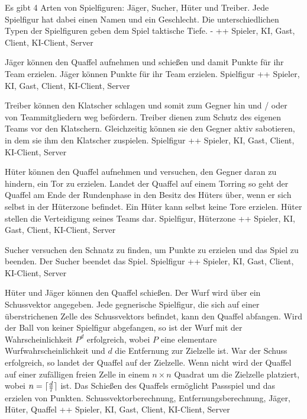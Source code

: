         {Es gibt 4 Arten von Spielfiguren: Jäger, Sucher, Hüter und Treiber. Jede Spielfigur hat dabei einen Namen und ein Geschlecht.}
        {Die unterschiedlichen Typen der Spielfiguren geben dem Spiel taktische Tiefe.}
        {-}
        {++}
        {Spieler, KI, Gast, Client, KI-Client, Server}

        {Jäger können den Quaffel aufnehmen und schießen und damit Punkte für ihr Team erzielen.}
        {Jäger können Punkte für ihr Team erzielen.}
        {Spielfigur}
        {++}
        {Spieler, KI, Gast, Client, KI-Client, Server}

        {Treiber können den Klatscher schlagen und somit zum Gegner hin und / oder von Teammitgliedern weg befördern.}
        {Treiber dienen zum Schutz des eigenen Teams vor den Klatschern. Gleichzeitig können sie den Gegner aktiv sabotieren, in dem sie ihm den Klatscher zuspielen.}
        {Spielfigur}
        {++}
        {Spieler, KI, Gast, Client, KI-Client, Server}

        {Hüter können den Quaffel aufnehmen und versuchen, den Gegner daran zu hindern, ein Tor zu erzielen. Landet der Quaffel auf einem Torring so geht der Quaffel am Ende der Rundenphase in den Besitz des Hüters über, wenn er sich selbst in der Hüterzone befindet. Ein Hüter kann selbst keine Tore erzielen.}
        {Hüter stellen die Verteidigung seines Teams dar.}
        {Spielfigur, Hüterzone}
        {++}
        {Spieler, KI, Gast, Client, KI-Client, Server}

        {Sucher versuchen den Schnatz zu finden, um Punkte zu erzielen und das Spiel zu beenden.}
        {Der Sucher beendet das Spiel.}
        {Spielfigur}
        {++}
        {Spieler, KI, Gast, Client, KI-Client, Server}
        
        {Hüter und Jäger können den Quaffel schießen. Der Wurf wird über ein Schussvektor angegeben. Jede gegnerische Spielfigur, die sich auf einer überstrichenen Zelle des Schussvektors befindet, kann den Quaffel abfangen. Wird der Ball von keiner Spielfigur abgefangen, so ist der Wurf mit der Wahrscheinlichkeit $P^d$ erfolgreich, wobei $P$ eine elementare Wurfwahrscheinlichkeit und $d$ die Entfernung zur Zielzelle ist. War der Schuss erfolgreich, so landet der Quaffel auf der Zielzelle. Wenn nicht wird der Quaffel auf einer zufälligen freien Zelle in einem $n\times n$ Quadrat um die Zielzelle platziert, wobei $n=\lceil \frac{d}{7}\rceil$ ist.}			
        {Das Schießen des Quaffels ermöglicht Passspiel und das erzielen von Punkten.}
        {Schussvektorberechnung, Entfernungsberechnung, Jäger, Hüter, Quaffel}
        {++}
        {Spieler, KI, Gast, Client, KI-Client, Server}
        
